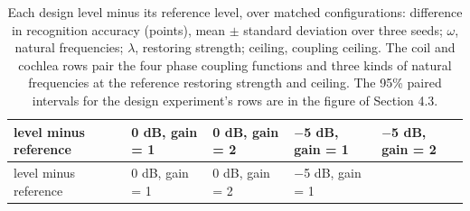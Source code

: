 \documentclass[10pt]{article}
\begin{document}
\begin{longtable}[]{@{}
  >{\raggedright\arraybackslash}p{}
  >{\raggedright\arraybackslash}p{}
  >{\raggedright\arraybackslash}p{}
  >{\raggedright\arraybackslash}p{}
  >{\raggedright\arraybackslash}p{}@{}}
\caption{Each design level minus its reference level, over matched
configurations: difference in recognition accuracy (points), mean
\ensuremath{\pm} standard deviation over three seeds;
\ensuremath{\omega}, natural frequencies; \ensuremath{\lambda},
restoring strength; ceiling, coupling ceiling. The coil and cochlea rows
pair the four phase coupling functions and three kinds of natural
frequencies at the reference restoring strength and ceiling. The 95\%
paired intervals for the design experiment's rows are in the figure of
Section 4.3.}\tabularnewline
\toprule\noalign{}
\begin{minipage}[b]{\linewidth}\raggedright
level minus reference
\end{minipage} & \begin{minipage}[b]{\linewidth}\raggedright
0 dB, gain = 1
\end{minipage} & \begin{minipage}[b]{\linewidth}\raggedright
0 dB, gain = 2
\end{minipage} & \begin{minipage}[b]{\linewidth}\raggedright
\ensuremath{-}5 dB, gain = 1
\end{minipage} & \begin{minipage}[b]{\linewidth}\raggedright
\ensuremath{-}5 dB, gain = 2
\end{minipage} \\
\midrule\noalign{}
\endfirsthead
\toprule\noalign{}
\begin{minipage}[b]{\linewidth}\raggedright
level minus reference
\end{minipage} & \begin{minipage}[b]{\linewidth}\raggedright
0 dB, gain = 1
\end{minipage} & \begin{minipage}[b]{\linewidth}\raggedright
0 dB, gain = 2
\end{minipage} & \begin{minipage}[b]{\linewidth}\raggedright
\ensuremath{-}5 dB, gain = 1
\end{minipage} & \begin{minipage}[b]{\linewidth}\raggedright

\end{minipage}
\end{longtable}
\end{document}

